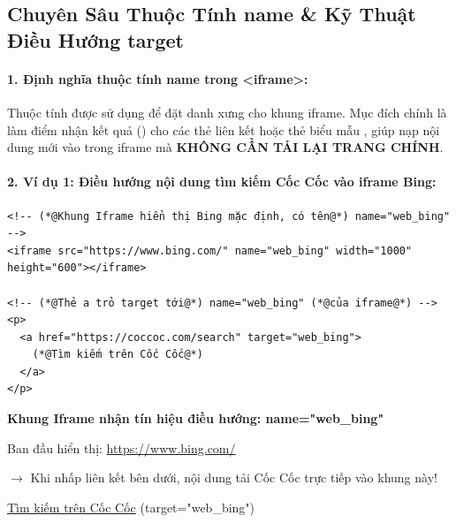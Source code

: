 \subsection{Chuyên Sâu Thuộc Tính name \& Kỹ Thuật Điều Hướng target}

\paragraph{1. Định nghĩa thuộc tính name trong <iframe>:}
Thuộc tính  được sử dụng để đặt danh xưng cho khung iframe. Mục đích chính là làm điểm nhận kết quả () cho các thẻ liên kết  hoặc thẻ biểu mẫu , giúp nạp nội dung mới vào trong iframe mà \textbf{KHÔNG CẦN TẢI LẠI TRANG CHÍNH}.

\paragraph{2. Ví dụ 1: Điều hướng nội dung tìm kiếm Cốc Cốc vào iframe Bing:}
\begin{codeWindow}
\begin{lstlisting}[language=HTML5]
<!-- (*@Khung Iframe hiển thị Bing mặc định, có tên@*) name="web_bing" -->
<iframe src="https://www.bing.com/" name="web_bing" width="1000" height="600"></iframe>

<!-- (*@Thẻ a trỏ target tới@*) name="web_bing" (*@của iframe@*) -->
<p>
  <a href="https://coccoc.com/search" target="web_bing">
    (*@Tìm kiếm trên Cốc Cốc@*)
  </a>
</p>
\end{lstlisting}
\end{codeWindow}

\begin{browserWindow}[https://www.bing.com (name="web\_bing")]
\centering\sffamily\vspace{4pt}
{\bfseries\color{primaryBlue}\large Khung Iframe nhận tín hiệu điều hướng: name="web\_bing"} \par\vspace{6pt}
\small Ban đầu hiển thị: \textcolor{primaryBlue}{\underline{https://www.bing.com/}} \par\vspace{4pt}
\small\textcolor{accentOrange}{$\rightarrow$ Khi nhấp liên kết bên dưới, nội dung tải Cốc Cốc trực tiếp vào khung này!} \par\vspace{8pt}
\textcolor{primaryBlue}{\underline{Tìm kiếm trên Cốc Cốc}} \quad \small\textcolor{codeComment}{(target="web\_bing")} \par\vspace{4pt}
\end{browserWindow}

